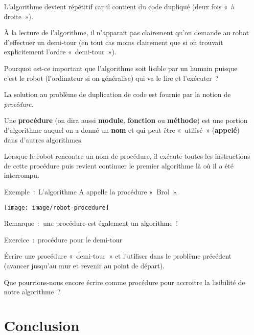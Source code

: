 	\begin{liste}
	\item 
		L’algorithme devient répétitif car il contient du code dupliqué
		(deux fois «~à droite~»).
	\item 
		À la lecture de l’algorithme, 
		il n’apparait pas clairement qu’on demande au robot 
		d’effectuer un demi-tour
		(en tout cas moins clairement que si on trouvait explicitement
		l’ordre «~demi-tour~»).
	\end{liste}

	Pourquoi est-ce important que l’algorithme soit lisible
	par un humain puisque c’est le robot
	(l’ordinateur si on généralise) qui va le lire et
	l’exécuter~?

	La solution au problème de duplication de code est fournie par la notion
	de \textit{procédure}.

	Une \textbf{procédure} (on dira aussi \textbf{module}, \textbf{fonction}
	ou \textbf{méthode}) est une portion d’algorithme
	auquel on a donné un \textbf{nom} et qui peut être «~utilisé~»
	(\textbf{appelé}) dans d’autres algorithmes.

	Lorsque le robot rencontre un nom de procédure, il exécute toutes les
	instructions de cette procédure puis revient continuer le premier
	algorithme là où il a été interrompu.

	Exemple~:~L’algorithme A appelle la procédure «~Brol~».

	\begin{center}
	\texttt{[image: image/robot-procedure]}
	
	{Remarque~:~une procédure est également un algorithme~!}
	\end{center}

	
	\begin{Emphase}[exercice]{Exercice~:~procédure pour le demi-tour}
	
		Écrire une procédure «~demi-tour~» et l’utiliser dans
		le problème précédent (avancer jusqu’au mur et revenir
		au point de départ).
		
		Que pourrions-nous encore écrire comme procédure pour accroitre
		la lisibilité de notre algorithme~?

	\end{Emphase}

\section{Conclusion}

